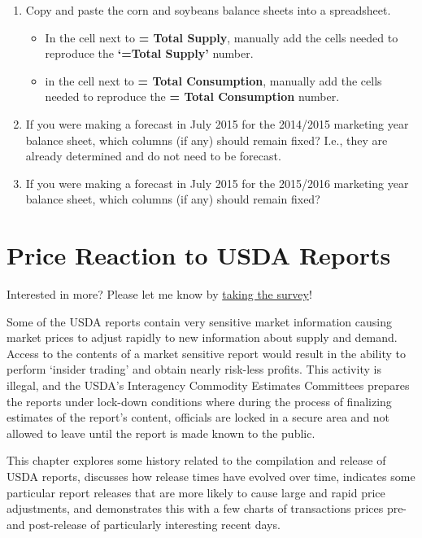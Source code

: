 \documentclass[
  letterpaper,
  DIV=11,
  numbers=noendperiod]{scrreprt}
\providecommand{\tightlist}{%
  \setlength{\itemsep}{0pt}\setlength{\parskip}{0pt}}\usepackage{longtable,booktabs,array}
\begin{document}
\begin{enumerate}
\def\labelenumi{\arabic{enumi}.}
\item
  Copy and paste the corn and soybeans balance sheets into a
  spreadsheet.

  \begin{itemize}
  \tightlist
  \item
    In the cell next to \textbf{= Total Supply}, manually add the cells
    needed to reproduce the \textbf{`=Total Supply'} number.
  \item
    in the cell next to \textbf{= Total Consumption}, manually add the
    cells needed to reproduce the \textbf{= Total Consumption} number.
  \end{itemize}
\item
  If you were making a forecast in July 2015 for the 2014/2015 marketing
  year balance sheet, which columns (if any) should remain fixed? I.e.,
  they are already determined and do not need to be forecast.
\item
  If you were making a forecast in July 2015 for the 2015/2016 marketing
  year balance sheet, which columns (if any) should remain fixed?
\end{enumerate}


\chapter{Price Reaction to USDA
Reports}\label{price-reaction-to-usda-reports}

{Interested in more? Please let me know by}
\href{https://forms.gle/Q3VByCQZHjfQSy9D7}{taking the survey}!

Some of the USDA reports contain very sensitive market information
causing market prices to adjust rapidly to new information about supply
and demand. Access to the contents of a market sensitive report would
result in the ability to perform `insider trading' and obtain nearly
risk-less profits. This activity is illegal, and the USDA's Interagency
Commodity Estimates Committees prepares the reports under lock-down
conditions where during the process of finalizing estimates of the
report's content, officials are locked in a secure area and not allowed
to leave until the report is made known to the public.

This chapter explores some history related to the compilation and
release of USDA reports, discusses how release times have evolved over
time, indicates some particular report releases that are more likely to
cause large and rapid price adjustments, and demonstrates this with a
few charts of transactions prices pre- and post-release of particularly
interesting recent days.
\end{document}
